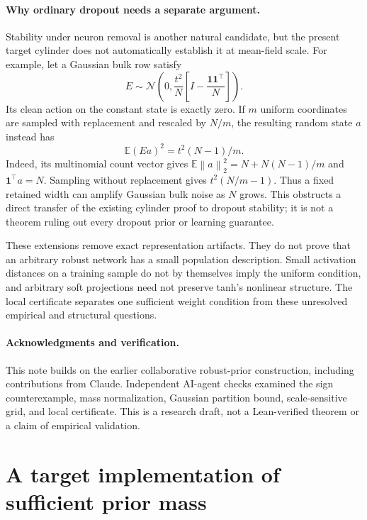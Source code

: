 \documentclass[11pt]{article}
\newcommand{\E}{\mathbb E}
\newcommand{\norm}[1]{\left\|#1\right\|}
\begin{document}
\paragraph{Why ordinary dropout needs a separate argument.}
Stability under neuron removal is another natural candidate, but the present
target cylinder does not automatically establish it at mean-field scale.
For example, let a Gaussian bulk row satisfy
\[
 E\sim\mathcal N\!\left(0,\frac{t^2}{N}
       \left[I-\frac{\boldsymbol1\boldsymbol1^\top}{N}\right]\right).
\]
Its clean action on the constant state is exactly zero. If $m$ uniform
coordinates are sampled with replacement and rescaled by $N/m$, the
resulting random state $a$ instead has
\[
 \E(Ea)^2=t^2(N-1)/m.
\]
Indeed, its multinomial count vector gives
$\E\norm a_2^2=N+N(N-1)/m$ and
$\boldsymbol1^\top a=N$. Sampling without replacement gives
$t^2(N/m-1)$. Thus a fixed retained width can amplify Gaussian bulk noise
as $N$ grows. This obstructs a direct transfer of the existing cylinder
proof to dropout stability; it is not a theorem ruling out every dropout
prior or learning guarantee.

These extensions remove exact representation artifacts. They do not prove
that an arbitrary robust network has a small population description. Small
activation distances on a training sample do not by themselves imply the
uniform condition, and arbitrary soft projections need not preserve tanh's
nonlinear structure. The local certificate separates one sufficient weight
condition from these unresolved empirical and structural questions.

\paragraph{Acknowledgments and verification.}
This note builds on the earlier collaborative robust-prior construction,
including contributions from Claude. Independent AI-agent checks examined
the sign counterexample, mass normalization, Gaussian partition bound,
scale-sensitive grid, and local certificate. This is a research draft,
not a Lean-verified theorem or a claim of empirical validation.

\appendix
\section{A target implementation of sufficient prior mass}\label{app:cylinder}
\end{document}
